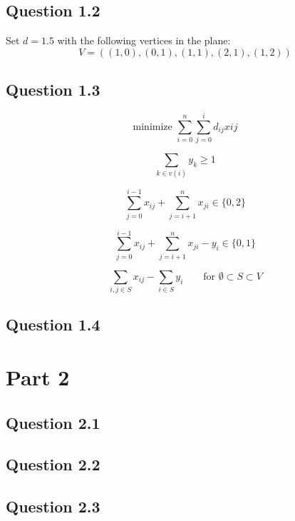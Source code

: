 \documentclass{sig-alternate}
\begin{document}
\subsection*{Question 1.2}

Set $d=1.5$ with the following vertices in the plane: \[ V=((1,0),(0,1),(1,1),(2,1),(1,2)) \]

\subsection*{Question 1.3}

\begin{equation}
    \text{minimize } \sum_{i=0}^{n}\sum_{j=0}^{i} d_{ij}x{ij}
\end{equation}

\begin{equation}
    \sum_{k \in v(i)} y_k \geq 1
\end{equation}

\begin{equation}
    \sum_{j=0}^{i-1} x_{ij} + \sum_{j=i+1}^{n} x_{ji} \in \{0,2\}
\end{equation}

\begin{equation}
    \sum_{j=0}^{i-1} x_{ij} + \sum_{j=i+1}^{n} x_{ji} - y_i \in \{0,1\}
\end{equation}

\begin{equation}
    \sum_{i,j \in S} x_{ij} - \sum_{i \in S} y_i \qquad \text{for } \emptyset \subset S \subset V
\end{equation}

\subsection*{Question 1.4}

\section*{Part 2}
\subsection*{Question 2.1}
\subsection*{Question 2.2}
\subsection*{Question 2.3}

\end{document}
